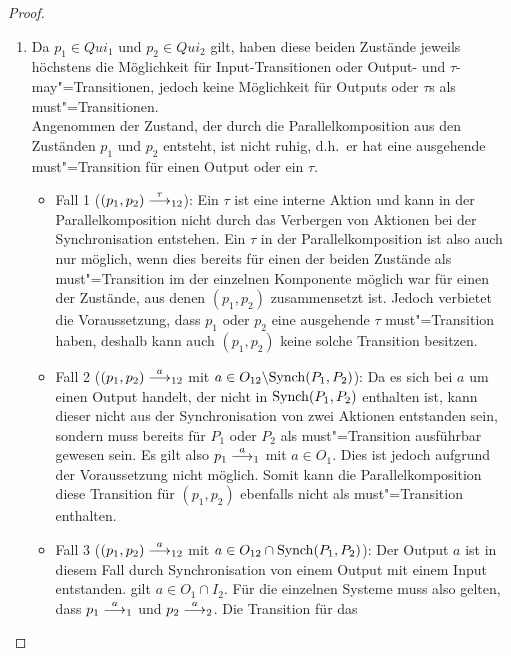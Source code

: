 \begin{proof}\mbox{}
  \begin{enumerate}
    \item Da $p_1\in Qui_1$ und $p_2\in Qui_2$ gilt, haben diese beiden
      Zustände jeweils höchstens die Möglichkeit für Input-Transitionen oder
      Output- und $\tau$-may"=Transitionen, jedoch keine Möglichkeit für Outputs
      oder $\tau$s als must"=Transitionen.\\
      Angenommen der Zustand, der durch die Parallelkomposition aus den
      Zuständen $p_1$ und $p_2$ entsteht, ist nicht ruhig, d.h.\ er hat eine
      ausgehende must"=Transition für einen Output oder ein $\tau$.
      \begin{itemize}
        \item Fall 1 \big($(p_1,p_2)\must[\tau]_{12}$\big): Ein $\tau$ ist eine
          interne Aktion und kann in der Parallelkomposition nicht durch das
          Verbergen von Aktionen bei der Synchronisation entstehen. Ein $\tau$
          in der Parallelkomposition ist also auch nur möglich, wenn dies
          bereits für einen der beiden Zustände als must"=Transition im der
          einzelnen Komponente möglich war für einen der Zustände, aus denen
          $(p_1,p_2)$ zusammensetzt ist. Jedoch verbietet die Voraussetzung,
          dass $p_1$ oder $p_2$ eine ausgehende $\tau$ must"=Transition haben,
          deshalb kann auch $(p_1,p_2)$ keine solche Transition besitzen.
        \item Fall 2 \big($(p_1,p_2)\must[a]_{12}$ mit $a\in O_{12}\backslash
          \mathrm{Synch}(P_1,P_2)$\big): Da es sich bei $a$ um einen Output handelt, der
          nicht in $\mathrm{Synch} (P_1,P_2)$ enthalten ist, kann dieser nicht aus der
          Synchronisation von zwei Aktionen entstanden sein, sondern muss
          bereits für $P_1$ oder $P_2$ als must"=Transition ausführbar gewesen
          sein. Es gilt also \oBdA{} $p_1\must[a]_1$ mit $a\in O_1$. Dies ist
          jedoch aufgrund der Voraussetzung nicht möglich. Somit kann die
          Parallelkomposition diese Transition für $(p_1,p_2)$ ebenfalls nicht
          als must"=Transition enthalten.
        \item Fall 3 \big($(p_1,p_2)\must[a]_{12}$ mit $a\in O_{12}\cap\mathrm{Synch}
          (P_1,P_2)$\big): Der Output $a$ ist in diesem Fall durch
          Synchronisation von einem Output mit einem Input entstanden. \OBdA{}
          gilt $a\in O_1\cap I_2$. Für die einzelnen Systeme muss also gelten,
          dass $p_1\must[a]_1$ und $p_2\must[a]_2$. Die Transition für das

\end{itemize}
\end{enumerate}
\end{proof}
